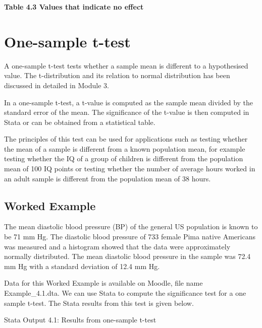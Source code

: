 \documentclass[
]{memoir}
\begin{document}
\textbf{Table 4.3 Values that indicate no effect}

\hypertarget{one-sample-t-test}{%
\section{One-sample t-test}\label{one-sample-t-test}}

A one-sample t-test tests whether a sample mean is different to a hypothesised value. The t-distribution and its relation to normal distribution has been discussed in detailed in Module 3.

In a one-sample t-test, a t-value is computed as the sample mean divided by the standard error of the mean. The significance of the t-value is then computed in Stata or can be obtained from a statistical table.

The principles of this test can be used for applications such as testing whether the mean of a sample is different from a known population mean, for example testing whether the IQ of a group of children is different from the population mean of 100 IQ points or testing whether the number of average hours worked in an adult sample is different from the population mean of 38 hours.

\hypertarget{worked-example-4}{%
\subsection{Worked Example}\label{worked-example-4}}

The mean diastolic blood pressure (BP) of the general US population is known to be 71 mm Hg. The diastolic blood pressure of 733 female Pima native Americans was measured and a histogram showed that the data were approximately normally distributed. The mean diastolic blood pressure in the sample was 72.4 mm Hg with a standard deviation of 12.4 mm Hg.

Data for this Worked Example is available on Moodle, file name Example\_4.1.dta. We can use Stata to compute the significance test for a one sample t-test. The Stata results from this test is given below.

Stata Output 4.1: Results from one-sample t-test
\end{document}
